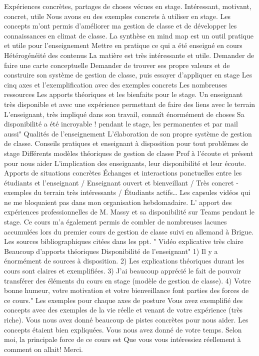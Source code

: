 \documentclass[
  french,
]{article}
\begin{document}
Expériences concrètes, partages de choses vécues en stage.
Intéressant, motivant, concret, utile
Nous avons eu des exemples concrets à utiliser en stage. Les concepts m'ont permis d'améliorer ma gestion de classe et de développer les connaissances en climat de classe. La synthèse en mind map est un outil pratique et utile pour l'enseignement
Mettre en pratique ce qui a été enseigné en cours
Hétérogénéité des contenus
La matière est très intéressante et utile.
Demander de faire une carte conceptuelle
Demander de trouver ses propre valeurs et de construire son système de gestion de classe, puis essayer d'appliquer en stage
Les cinq axes et l'exemplification avec des exemples concrets
Les nombreuses ressources
Les apports théoriques et les bienfaits pour le stage.
Un enseignant très disponible et avec une expérience permettant de faire des liens avec le terrain
L'enseignant, très impliqué dans son travail, connaît énormément de choses
Sa disponibilité a été incroyable ! pendant le stage, les permanentes et par mail aussi"
Qualités de l'enseignement
L'élaboration de son propre système de gestion de classe.
Conseils pratiques et enseignant à disposition pour tout problèmes de stage
Différents modèles théoriques de gestion de classe
Prof à l'écoute et présent pour nous aider
L'implication des enseignants, leur disponibilité et leur écoute.
Apports de situations concrètes
Échanges et interactions ponctuelles entre les étudiants et l'enseignant / Enseignant ouvert et bienveillant / Très concret - exemples du terrain très intéressants / Étudiants actifs\ldots{}
Les capsules vidéos qui ne me bloquaient pas dans mon organisation hebdomadaire.
L' apport des expériences professionnelles de M. Massy et sa disponibilité sur Teams pendant le stage.
Ce cours m'a également permis de combler de nombreuses lacunes accumulées lors du premier cours de gestion de classe suivi en allemand à Brigue.
Les sources bibliographiques citées dans les ppt. "
Vidéo explicative très claire
Beaucoup d'apports théoriques
Disponibilité de l'enseignant"
1) Il y a énormément de sources à disposition.
2) Les explications théoriques durant les cours sont claires et exemplifiées.
3) J'ai beaucoup apprécié le fait de pouvoir transférer des éléments du cours en stage (modèle de gestion de classe).
4) Votre bonne humeur, votre motivation et votre bienveillance font parties des forces de ce cours."
Les exemples pour chaque axes de posture
Vous avez exemplifié des concepts avec des exemples de la vie réelle et venant de votre expérience (très riche). Vous nous avez donné beaucoup de pistes concrètes pour nous aider. Les concepts étaient bien expliquées. Vous nous avez donné de votre temps. Selon moi, la principale force de ce cours est Que vous vous intéressiez réellement à comment on allait! Merci.
\end{document}
